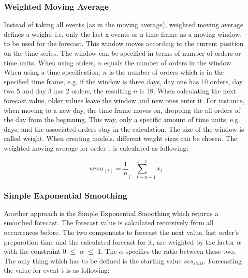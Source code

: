 \subsubsection{Weighted Moving Average}\label{subsubsection:Weighted Moving Average}
Instead of taking all events (as in the moving average), weighted moving average defines a weight, i.e. only the last x events or a time frame  as a moving window, to be used for the forecast. This window moves according to the current position on the time series. The window can be specified in terms of number of orders or time units. When using orders, $n$ equals the number of orders in the window. When using a time specification, $n$ is the number of orders which is in the specified time frame, e.g. if the window is three days, day one has 10 orders, day two 5 and day 3 has 2 orders, the resulting $n$ is 18. When calculating the next forecast value, older values leave the window and new ones enter it. For instance, when moving to a new day, the time frame moves on, dropping the all orders of the day from the beginning. This way, only a specific amount of time units, e.g. days, and the associated orders stay in the calculation. The size of the window is called weight. When creating models, different weight sizes can be chosen.\newline
The weighted moving average for order t is calculated as following:

\begin{center}
\begin{equation}
wma_{(t)}= \frac{1}{n}\sum^{t-1}_{l = t-n-1} x_{l}
\end{equation}
\end{center}

\subsubsection{Simple Exponential Smoothing}\label{subsubsection:Simple Exponential Smoothing}
Another approach is the Simple Exponential Smoothing which returns a smoothed forecast. The forecast value is calculated recursively from all occurrences before. The two components to forecast the next value, last order's preparation time and the calculated forecast for it, are weighted by the factor $\alpha$ with the constraint $0$ $\le$ $\alpha$ $\le$ $1$. The $\alpha$ specifies the ratio between these two. The only thing which has to be defined is the starting value $ses_{start}$.\newline
Forecasting the value for event t is as following:


